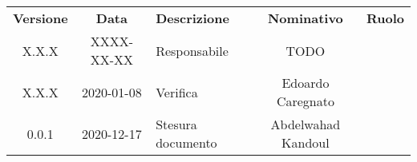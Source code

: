 {
    \renewcommand{\arraystretch}{1.5}
    \centering
    \begin{longtable}{ c c  C{4cm}  c  c }
        \rowcolor{\primaryColor}
        \textcolor{\secondaryColor}{
        \textbf{Versione}}     & \textcolor{\secondaryColor}{\textbf{Data}}       & \textcolor{\secondaryColor}
        {\textbf{Descrizione}} & \textcolor{\secondaryColor}{\textbf{Nominativo}} & \textcolor{\secondaryColor}{\textbf{Ruolo}}                          \\


        X.X.X                  & XXXX-XX-XX                                       & Responsabile                                & TODO & \responsabile{} \\
        X.X.X                  & 2020-01-08                                      & Verifica                                   	 & Edoardo Caregnato & \verificatore{} \\
        0.0.1                  & 2020-12-17						 & Stesura documento 		& Abdelwahad Kandoul & \redattore{}    \\
    \end{longtable}
}